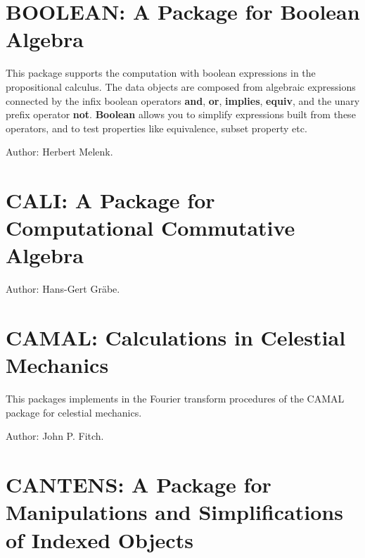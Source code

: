 \section{BOOLEAN: A Package for Boolean Algebra}

This package supports the computation with boolean expressions in the
propositional calculus.  The data objects are composed from algebraic
expressions connected by the infix boolean operators \textbf{and}, \textbf{or},
\textbf{implies}, \textbf{equiv}, and the unary prefix operator \textbf{not}.
\textbf{Boolean} allows you to simplify expressions built from these
operators, and to test properties like equivalence, subset property etc.

Author: Herbert Melenk.



\newpage

\section{CALI: A Package for Computational Commutative Algebra}

\iffalse
This package contains algorithms for computations in commutative algebra
closely related to the Gr\"obner algorithm for ideals and modules.  Its
heart is a new implementation of the Gr\"obner algorithm that also allows
for the computation of syzygies.  This implementation is also applicable to
submodules of free modules with generators represented as rows of a matrix.
\fi
Author: Hans-Gert Gr\"abe.



\newpage

\section{CAMAL: Calculations in Celestial Mechanics}
\label{CAMAL}

This packages implements in \REDUCE the Fourier transform procedures of the
CAMAL package for celestial mechanics.

Author: John P. Fitch.



\newpage

\section{CANTENS: A Package for Manipulations
and Simplifications of Indexed Objects}

